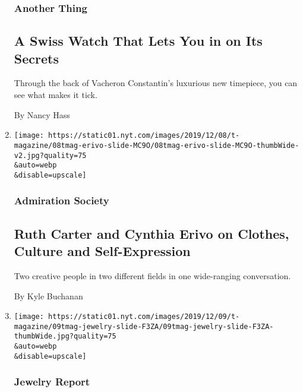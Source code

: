 \begin{enumerate}
  \hypertarget{another-thing}{%
  \subsubsection{Another Thing}\label{another-thing}}

  \hypertarget{a-swiss-watch-that-lets-you-in-on-its-secrets}{%
  \subsection{A Swiss Watch That Lets You in on Its
  Secrets}\label{a-swiss-watch-that-lets-you-in-on-its-secrets}}

  Through the back of Vacheron Constantin's luxurious new timepiece, you
  can see what makes it tick.

  By Nancy Hass
\item
  \href{/2019/12/10/t-magazine/ruth-carter-cynthia-erivo.html}{}

  \texttt{[image: https://static01.nyt.com/images/2019/12/08/t-magazine/08tmag-erivo-slide-MC9O/08tmag-erivo-slide-MC9O-thumbWide-v2.jpg?quality=75\\\&auto=webp\\\&disable=upscale]}

  \hypertarget{admiration-society}{%
  \subsubsection{Admiration Society}\label{admiration-society}}

  \hypertarget{ruth-carter-and-cynthia-erivo-on-clothes-culture-and-self-expression}{%
  \subsection{Ruth Carter and Cynthia Erivo on Clothes, Culture and
  Self-Expression}\label{ruth-carter-and-cynthia-erivo-on-clothes-culture-and-self-expression}}

  Two creative people in two different fields in one wide-ranging
  conversation.

  By Kyle Buchanan
\item
  \href{/2019/12/09/t-magazine/colorful-jewelry.html}{}

  \texttt{[image: https://static01.nyt.com/images/2019/12/09/t-magazine/09tmag-jewelry-slide-F3ZA/09tmag-jewelry-slide-F3ZA-thumbWide.jpg?quality=75\\\&auto=webp\\\&disable=upscale]}

  \hypertarget{jewelry-report}{%
  \subsubsection{Jewelry Report}\label{jewelry-report}}


\end{enumerate}
